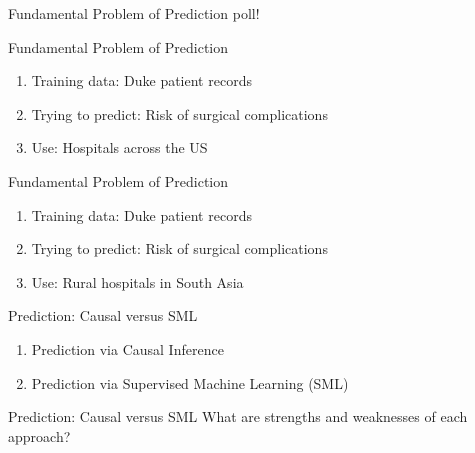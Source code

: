 \documentclass[11pt,handout]{beamer}
\begin{document}
\begin{frame}[c]{Fundamental Problem of Prediction}
poll!
\end{frame}

\begin{frame}[c]{Fundamental Problem of Prediction}
\begin{enumerate}
  \item Training data: Duke patient records
  \item Trying to predict: Risk of surgical complications
  \item Use: Hospitals across the US
\end{enumerate}
\end{frame}

\begin{frame}[c]{Fundamental Problem of Prediction}
\begin{enumerate}
  \item Training data: Duke patient records
  \item Trying to predict: Risk of surgical complications
  \item Use: Rural hospitals in South Asia
\end{enumerate}
\end{frame}

\begin{frame}[c]{Prediction: Causal versus SML}
  \begin{enumerate}
    \item Prediction via Causal Inference
    \begin{itemize}
    \end{itemize}
    \item Prediction via Supervised Machine Learning (SML)
    \begin{itemize}
    \end{itemize}
  \end{enumerate}
\end{frame}

\begin{frame}[c]{Prediction: Causal versus SML}
What are strengths and weaknesses of each approach?
\end{frame}
\end{document}

